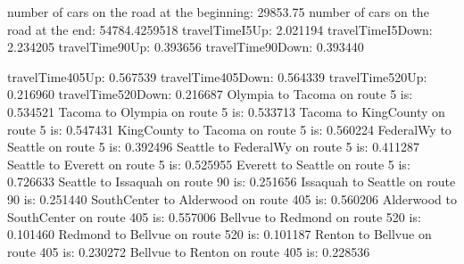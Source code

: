 number of cars on the road at the beginning:
29853.75
number of cars on the road at the end:
54784.4259518
travelTimeI5Up: 2.021194
travelTimeI5Down: 2.234205
travelTime90Up: 0.393656
travelTime90Down: 0.393440

travelTime405Up: 0.567539
travelTime405Down: 0.564339
travelTime520Up: 0.216960
travelTime520Down: 0.216687
Olympia to Tacoma on route 5 is: 0.534521
Tacoma to Olympia on route 5 is: 0.533713
Tacoma to KingCounty on route 5 is: 0.547431
KingCounty to Tacoma on route 5 is: 0.560224
FederalWy to Seattle on route 5 is: 0.392496
Seattle to FederalWy on route 5 is: 0.411287
Seattle to Everett on route 5 is: 0.525955
Everett to Seattle on route 5 is: 0.726633
Seattle to Issaquah on route 90 is: 0.251656
Issaquah to Seattle on route 90 is: 0.251440
SouthCenter to Alderwood on route 405 is: 0.560206
Alderwood to SouthCenter on route 405 is: 0.557006
Bellvue to Redmond on route 520 is: 0.101460
Redmond to Bellvue on route 520 is: 0.101187
Renton to Bellvue on route 405 is: 0.230272
Bellvue to Renton on route 405 is: 0.228536